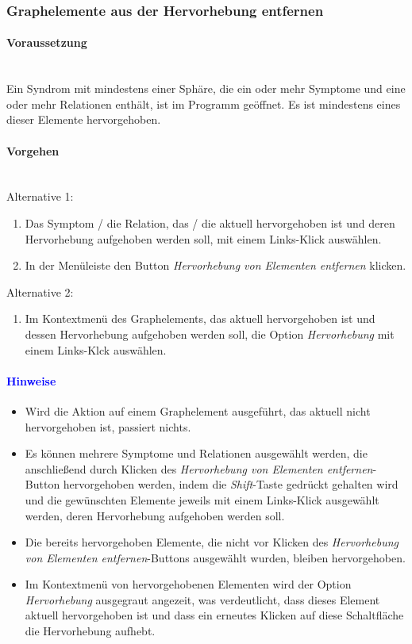 \documentclass[enabledeprecatedfontcommands,fontsize=11pt,paper=a4,twoside]{scrartcl}
\newcounter{one}
\newcommand*{\hint}{\paragraph{\textcolor{blue}{Hinweise}}}
\newcommand*{\condition}{\paragraph{Voraussetzung}$\;$ \vspace{0.2cm}\\}
\newcommand*{\actions}{\paragraph{Vorgehen} $\;$\vspace{0.2cm}\\}
\begin{document}
			\newpage
		\subsubsection{Graphelemente aus der Hervorhebung entfernen}
			\condition 	
		Ein Syndrom mit mindestens einer Sphäre, die ein oder mehr Symptome und eine oder mehr Relationen enthält, ist im Programm geöffnet. Es ist mindestens eines dieser Elemente hervorgehoben.
		\actions
		Alternative 1:
		\begin{enumerate}
			\item Das Symptom / die Relation, das / die aktuell hervorgehoben ist und deren Hervorhebung aufgehoben werden soll, mit einem Links-Klick auswählen. 
			\item In der Menüleiste den Button \textit{Hervorhebung von Elementen entfernen} klicken.
		\end{enumerate}
				Alternative 2:
		\begin{enumerate}
			\item Im Kontextmenü des Graphelements, das aktuell hervorgehoben ist und dessen Hervorhebung aufgehoben werden soll, die Option \textit{Hervorhebung} mit einem Links-Klck auswählen.
		\end{enumerate}
		\hint
		\begin{itemize}
				\item Wird die Aktion auf einem Graphelement ausgeführt, das aktuell nicht hervorgehoben ist, passiert nichts.
					\item Es können mehrere Symptome und Relationen ausgewählt werden, die anschließend durch Klicken des \textit{Hervorhebung von Elementen entfernen}-Button hervorgehoben werden, indem die \textit{Shift}-Taste gedrückt gehalten wird und die gewünschten Elemente jeweils mit einem Links-Klick ausgewählt werden, deren Hervorhebung aufgehoben werden soll.
					\item Die bereits hervorgehoben Elemente, die nicht vor Klicken des \textit{Hervorhebung von Elementen entfernen}-Buttons ausgewählt wurden, bleiben hervorgehoben.
					\item Im Kontextmenü von hervorgehobenen Elementen wird der Option \textit{Hervorhebung}  ausgegraut angezeit, was verdeutlicht, dass dieses Element aktuell hervorgehoben ist und dass ein erneutes Klicken auf diese Schaltfläche die Hervorhebung aufhebt.
		\end{itemize}
\end{document}
